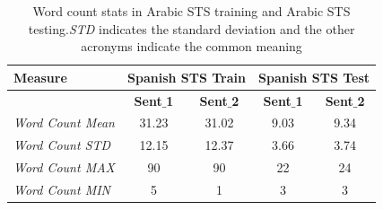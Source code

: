 \begin{enumerate}
\begin{table}
	\centering
	\begin{tabular}{l|cc|cc}
		\hline
		Measure   & \multicolumn{2}{c|}{Spanish STS Train} & \multicolumn{2}{c}{Spanish STS Test} \\
		\hline
		\multicolumn{1}{l|}{} & \textbf{Sent$\_$1} & \textbf{Sent$\_$2} & \textbf{Sent$\_$1} & \textbf{Sent$\_$2} \\
		\textit{Word Count Mean} & 31.23 & 31.02 & 9.03 & 9.34  \\
		\textit{Word Count STD} & 12.15 & 12.37 & 3.66 & 3.74  \\
		\textit{Word Count MAX} & 90 & 90 & 22 & 24  \\
		\textit{Word Count MIN} & 5 & 1 & 3 & 3  \\
		\hline
	\end{tabular}
	\caption[Word count stats in Arabic STS]{Word count stats in Arabic STS training and Arabic STS testing.\textit{STD} indicates the standard deviation and the other acronyms indicate the common meaning }
	\label{table:arabic_sts}
\end{table}

	
\end{enumerate}


